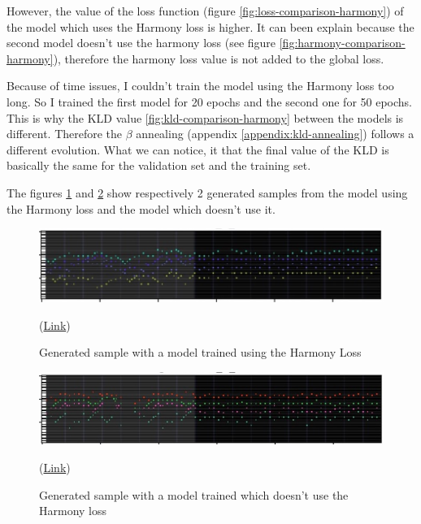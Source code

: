 \documentclass[12pt]{report}
\begin{document}
However, the value of the loss function (figure \ref{fig:loss-comparison-harmony}) of the model which uses the Harmony loss is higher.
It can been explain because the second model doesn't use the harmony loss (see figure \ref{fig:harmony-comparison-harmony}), therefore the harmony loss value is not added to the global loss.

Because of time issues, I couldn't train the model using the Harmony loss too long.
So I trained the first model for 20 epochs and the second one for 50 epochs.
This is why the KLD value \ref{fig:kld-comparison-harmony} between the models is different.
Therefore the $\beta$ annealing (appendix \ref{appendix:kld-annealing}) follows a different evolution.
What we can notice, it that the final value of the KLD is basically the same for the validation set and the training set.



The figures \ref{fig:exp:harmony:with} and \ref{fig:exp:harmony:without} show respectively 2 generated samples from the model using the Harmony loss and the model which doesn't use it.

\begin{figure}[htbp]
    \centering
    \includegraphics[width=\textwidth]{images/experiences/harmony-rnn/with-harmony.jpg}
    \caption{Generated sample with a model trained using the Harmony Loss}
    (\href{https://github.com/ValentinVignal/midiGenerator/blob/master/samples/harmony-comparison/generated_with_harmony.mid}{Link})
    \label{fig:exp:harmony:with}
\end{figure}
\begin{figure}[htbp]
    \centering
    \includegraphics[width=\textwidth]{images/experiences/harmony-rnn/without-harmony.jpg}
    \caption{Generated sample with a model trained which doesn't use the Harmony loss}
    (\href{https://github.com/ValentinVignal/midiGenerator/blob/master/samples/harmony-comparison/generated_without_harmony.mid}{Link})
    \label{fig:exp:harmony:without}
\end{figure}
\end{document}
